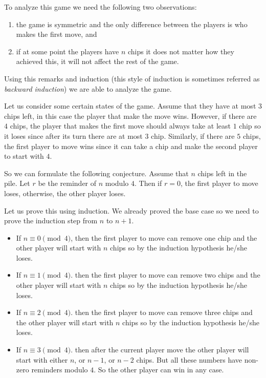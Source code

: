 To analyze this game we need the following two observations:
\begin{enumerate}
  \item the game is symmetric and the only difference between the players is
    who makes the first move, and
  \item if at some point the players have $n$ chips it does not matter how they
    achieved this, it will not affect the rest of the game.
\end{enumerate}
Using this remarks and induction (this style of induction is sometimes
referred as \emph{backward induction}) we are able to analyze the game.

Let us consider some certain states of the game.
Assume that they have at most $3$ chips left, in this case the player that make
the move wins. However, if there are $4$ chips, the
player that makes the first move should always take at least $1$ chip so it
loses since after its turn there are at most $3$ chip. Similarly, if there
are $5$ chips, the first player to move wins since it can take a chip and
make the second player to start with $4$.

So we can formulate the following conjecture.
Assume that $n$ chips left in the pile. Let $r$ be the reminder of $n$ modulo
$4$. Then if $r = 0$, the first player to move loses, otherwise, the other
player loses.

Let us prove this using induction. We already proved the base case so
we need to prove the induction step from $n$ to $n + 1$.
\begin{itemize}
  \item If $n \equiv 0 \pmod{4}$, then the first player to move can remove one
    chip and the other player will start with $n$ chips so by the induction
    hypothesis he/she loses.
  \item If $n \equiv 1 \pmod{4}$. then the first player to move can remove two
    chips and the other player will start with $n$ chips so by the induction
    hypothesis he/she loses.
  \item If $n \equiv 2 \pmod{4}$. then the first player to move can remove three
    chips and the other player will start with $n$ chips so by the induction
    hypothesis he/she loses.
  \item If $n \equiv 3 \pmod{4}$. then after the current player move the other
    player will start with either $n$, or $n - 1$, or $n - 2$ chips. But all
    these numbers have non-zero reminders modulo $4$. So the other player
    can win in any case.
\end{itemize}

